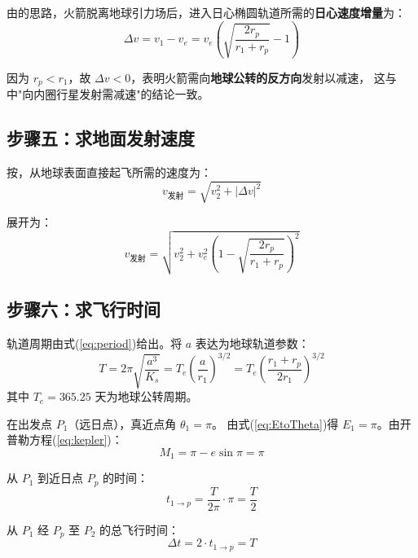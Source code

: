 \documentclass[UTF8,12pt,a4paper]{ctexart}
\begin{document}
由\cite[\S6.2, 式(6.8)]{qian2008}的思路，火箭脱离地球引力场后，进入日心椭圆轨道所需的\textbf{日心速度增量}为：
\begin{equation}\label{eq:deltaV}
    \Delta v = v_1 - v_e = v_e\left(\sqrt{\frac{2r_p}{r_1 + r_p}} - 1\right)
\end{equation}

因为 $r_p < r_1$，故 $\Delta v < 0$，表明火箭需向\textbf{地球公转的反方向}发射以减速，
这与\cite[\S6.2, pp.~121]{qian2008}中"向内圈行星发射需减速"的结论一致。

\subsection{步骤五：求地面发射速度}

按\cite[\S6.3, 第一方案, pp.~122]{qian2008}，从地球表面直接起飞所需的速度为：
\begin{equation}\label{eq:v_launch}
    v_{\text{发射}} = \sqrt{v_2^2 + |\Delta v|^2}
\end{equation}

展开为：
\begin{equation}
    v_{\text{发射}} = \sqrt{v_2^2 + v_e^2\left(1 - \sqrt{\frac{2r_p}{r_1 + r_p}}\right)^2}
\end{equation}

\subsection{步骤六：求飞行时间}

轨道周期由式(\ref{eq:period})给出。将 $a$ 表达为地球轨道参数：
\begin{equation}\label{eq:T}
    T = 2\pi\sqrt{\frac{a^3}{K_s}} = T_e\left(\frac{a}{r_1}\right)^{3/2}
      = T_e\left(\frac{r_1 + r_p}{2r_1}\right)^{3/2}
\end{equation}
其中 $T_e = 365.25$ 天为地球公转周期。

在出发点 $P_1$（远日点），真近点角 $\theta_1 = \pi$。
由式(\ref{eq:EtoTheta})得 $E_1 = \pi$。由开普勒方程(\ref{eq:kepler})：
\begin{equation}
    M_1 = \pi - e\sin\pi = \pi
\end{equation}

从 $P_1$ 到近日点 $P_p$ 的时间：
\begin{equation}
    t_{1\to p} = \frac{T}{2\pi} \cdot \pi = \frac{T}{2}
\end{equation}

从 $P_1$ 经 $P_p$ 至 $P_2$ 的总飞行时间：
\begin{equation}\label{eq:dt}
    \Delta t = 2 \cdot t_{1\to p} = T
\end{equation}
\end{document}
